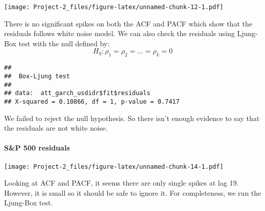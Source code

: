 \documentclass[]{article}
\newenvironment{Shaded}{\begin{snugshade}}{\end{snugshade}}
\newcommand{\KeywordTok}[1]{\textcolor[rgb]{0.13,0.29,0.53}{\textbf{#1}}}
\newcommand{\DataTypeTok}[1]{\textcolor[rgb]{0.13,0.29,0.53}{#1}}
\newcommand{\StringTok}[1]{\textcolor[rgb]{0.31,0.60,0.02}{#1}}
\newcommand{\OperatorTok}[1]{\textcolor[rgb]{0.81,0.36,0.00}{\textbf{#1}}}
\newcommand{\NormalTok}[1]{#1}
\let\oldparagraph\paragraph
\renewcommand{\paragraph}[1]{\oldparagraph{#1}\mbox{}}
\begin{document}
\begin{Shaded}
\end{Shaded}

\texttt{[image: Project-2\_files/figure-latex/unnamed-chunk-12-1.pdf]}

There is no significant spikes on both the ACF and PACF which show that
the residuals follows white noise model. We can also check the residuals
using Ljung-Box test with the null defined by:
\[H_{0}:\rho_{1}=\rho_{2}=...=\rho_{k}=0\]

\begin{Shaded}
\end{Shaded}

\begin{verbatim}
## 
##  Box-Ljung test
## 
## data:  att_garch_usdidr$fit$residuals
## X-squared = 0.10866, df = 1, p-value = 0.7417
\end{verbatim}

We failed to reject the null hypothesis. So there isn't enough evidence
to say that the residuals are not white noise.

\paragraph{S\&P 500 residuals}\label{sp-500-residuals}

\begin{Shaded}
\end{Shaded}

\texttt{[image: Project-2\_files/figure-latex/unnamed-chunk-14-1.pdf]}

Looking at ACF and PACF, it seems there are only single spikes at lag
19. However, it is small so it should be safe to ignore it. For
completeness, we run the Ljung-Box test.
\end{document}
